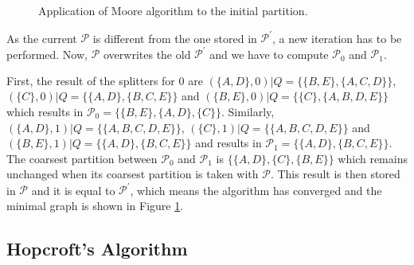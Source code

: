 {\begin{figure}
\centering
{}
\caption{Application of Moore algorithm to the initial partition.\label{fig:moore_fin}}
\end{figure}

As the current $\mathcal{P}$ is different from the one stored in $\mathcal{P}^{\prime}$, a new iteration has to be performed. Now, $\mathcal{P}$ overwrites the old $\mathcal{P}^{\prime}$ and we have to compute $\mathcal{P}_0$ and $\mathcal{P}_1$.

First, the result of the splitters for 0 are $(\{A,D\},0)|Q = \{\{B,E\},\{A,C,D\}\}$, $(\{C\},0)|Q = \{\{A,D\},\{B,C,E\}\}$ and $(\{B,E\},0)|Q = \{\{C\},\{A,B,D,E\}\}$ which results in \linebreak $\mathcal{P}_0 = \{\{B,E\}, \{A,D\}, \{C\}\}$. Similarly, $(\{A,D\},1)|Q = \{\{A,B,C,D,E\}\}$, $(\{C\},1)|Q = \{\{A,B,C,D,E\}\}$ and $(\{B,E\},1)|Q = \{\{A,D\},\{B,C,E\}\}$ and results in \linebreak $\mathcal{P}_1 = \{\{A,D\},\{B,C,E\}\}$. The coarsest partition between $\mathcal{P}_0$ and $\mathcal{P}_1$ is $\{\{A,D\},\{C\},\{B,E\}\}$ which remains unchanged when its coarsest partition is taken with $\mathcal{P}$. This result is then stored in $\mathcal{P}$ and it is equal to $\mathcal{P}^{\prime}$, which means the algorithm has converged and the minimal graph is shown in Figure \ref{fig:moore_fin}.

\subsection{Hopcroft's Algorithm}

}
